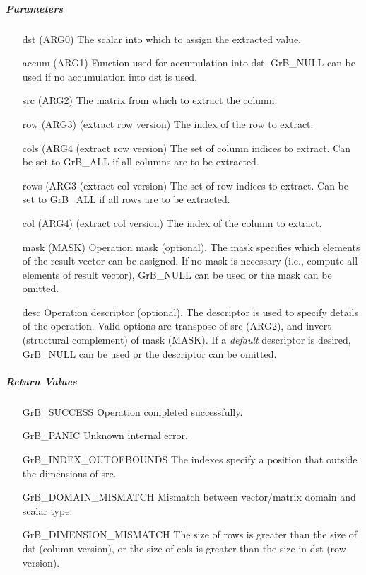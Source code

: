\subparagraph{Parameters}

\begin{itemize}[leftmargin=1in]
	\item[{\sf dst} (ARG0)]   The scalar into which to assign the extracted value.
	\item[{\sf accum} (ARG1)] Function used for accumulation into dst.  {\sf GrB\_NULL}
                              can be used if no accumulation into dst is used.
	\item[{\sf src} (ARG2)]   The matrix from which to extract the column.

    \item[{\sf row} (ARG3)]   (extract row version) The index of the row to extract.
    \item[{\sf cols (ARG4}]   (extract row version) The set of column indices to extract. Can
                              be set to {\sf GrB\_ALL} if all columns are
                              to be extracted.
   
    \item[{\sf rows (ARG3}]   (extract col version) The set of row indices to extract. Can
                              be set to {\sf GrB\_ALL} if all rows are
                              to be extracted.
	\item[{\sf col} (ARG4)]   (extract col version) The index of the column to extract.

	\item[{\sf mask} (MASK)]  Operation mask (optional). The mask
	specifies which elements of the result vector can be assigned.
	If no mask is necessary (i.e., compute all elements of result
	vector), {\sf GrB\_NULL} can be used or the mask can be omitted.

	\item[{\sf desc}] Operation descriptor (optional). The descriptor
    is used to specify details of the operation. Valid options are transpose
    of src ({\sf ARG2}), and invert (structural complement) of mask ({\sf MASK}). If
    a \emph{default} descriptor is desired,	{\sf GrB\_NULL} can be
    used or the descriptor can be omitted.
\end{itemize}

\subparagraph{Return Values}

\begin{itemize}[leftmargin=2.1in]
\item[{\sf GrB\_SUCCESS}] 	          Operation completed successfully.
\item[{\sf GrB\_PANIC}]	              Unknown internal error.
\item[{\sf GrB\_INDEX\_OUTOFBOUNDS}]  The indexes specify a position that outside the dimensions of src.
\item[{\sf GrB\_DOMAIN\_MISMATCH}]    Mismatch between vector/matrix domain and scalar type.
\item[{\sf GrB\_DIMENSION\_MISMATCH}] 
        The size of rows is greater than the size of dst (column version), or
        the size of cols is greater than the size in dst (row version).
\end{itemize}

